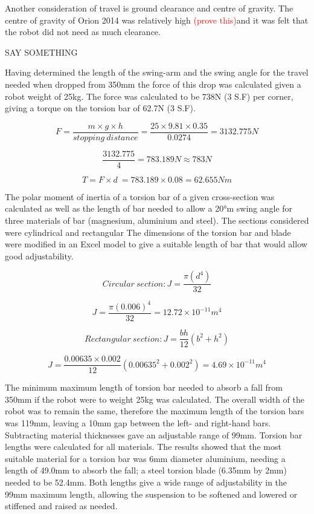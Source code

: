 Another consideration of travel is ground clearance and centre of gravity. The centre of gravity of Orion 2014 was relatively high \textcolor{red}{(prove this)}and it was felt that the robot did not need as much clearance.\par SAY SOMETHING

Having determined the length of the swing-arm and the swing angle for the travel needed when dropped from 350mm the force of this drop was calculated given a robot weight of 25kg. The force was calculated to be 738N (3 S.F) per corner, giving a torque on the torsion bar of 62.7N (3 S.F).\par
\begin{equation}
 F = \frac{m \times g \times h}{stopping\:distance} = \frac{25 \times 9.81 \times 0.35}{0.0274} = 3132.775N
\end{equation}

\[\frac{3132.775}{4} = 783.189N \approx 783N\]

\begin{equation}
T = F \times d\ = 783.189 \times 0.08 = 62.655Nm
\end{equation}

The polar moment of inertia of a torsion bar of a given cross-section was calculated as well as the length of bar needed to allow a 20°m swing angle for three materials of bar (magnesium, aluminium and steel). The sections considered were cylindrical and rectangular The dimensions of the torsion bar and blade were modified in an Excel model to give a suitable length of bar that would allow good adjustability. 

\begin{equation}
Circular\:section: J = \frac{\pi(d^4)}{32}
\end{equation}

\[J = \frac{\pi(0.006)^4}{32} = 12.72\times 10^{-11}m^4\]

\begin{equation}
Rectangular\: section: J = \frac{bh}{12}(b^2 + h^2)
\end{equation}


\[J = \frac{0.00635\times0.002}{12}(0.00635^2 + 0.002^2) = 4.69\times10^{-11}m^4\]

The minimum maximum length of torsion bar needed to absorb a fall from 350mm if the robot were to weight 25kg was calculated. The overall width of the robot was to remain the same, therefore the maximum length of the torsion bars was 119mm, leaving a 10mm gap between the left- and right-hand bars. Subtracting material thicknesses gave an adjustable range of 99mm. Torsion bar lengths were calculated for all materials. The results showed that the most suitable material for a torsion bar was 6mm diameter aluminium, needing a length of 49.0mm to absorb the fall; a steel torsion blade (6.35mm by 2mm) needed to be 52.4mm. Both lengths give a wide range of adjustability in the 99mm maximum length, allowing the suspension to be softened and lowered or stiffened and raised as needed.\par

